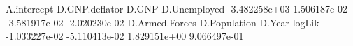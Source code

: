 \begin{Schunk}
\begin{Soutput}
   A.intercept D.GNP.deflator          D.GNP   D.Unemployed 
 -3.482258e+03   1.506187e-02  -3.581917e-02  -2.020230e-02 
D.Armed.Forces   D.Population         D.Year         logLik 
 -1.033227e-02  -5.110413e-02   1.829151e+00   9.066497e-01 
\end{Soutput}
\end{Schunk}
